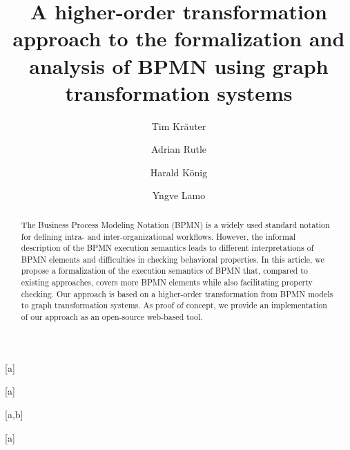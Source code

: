 \documentclass{lmcs} %
\begin{document}
\title[Formalization and analysis of BPMN using graph transformation systems]{A higher-order transformation approach to the formalization and analysis of BPMN using graph transformation systems\rsuper*}

\author[T.~Kr\"{a}uter]{Tim Kr\"{a}uter}[a]
\author[A.~Rutle]{Adrian Rutle}[a]
\author[H.~K\"{o}nig]{Harald K\"{o}nig}[a,b]
\author[Y.~Lamo]{Yngve Lamo}[a]

\address{Western Norway University of Applied Sciences, Bergen, Norway}

\address{University of Applied Sciences, FHDW, Hanover, Germany}

\begin{abstract}
  \noindent
The Business Process Modeling Notation (BPMN) is a widely used standard notation for defining intra- and inter-organizational workflows.
However, the informal description of the BPMN execution semantics leads to different interpretations of BPMN elements and difficulties in checking behavioral properties.
In this article, we propose a formalization of the execution semantics of BPMN that, compared to existing approaches, covers more BPMN elements while also facilitating property checking.
Our approach is based on a higher-order transformation from BPMN models to graph transformation systems.
As proof of concept, we provide an implementation of our approach as an open-source web-based tool. 
\end{abstract}

\maketitle
\end{document}
